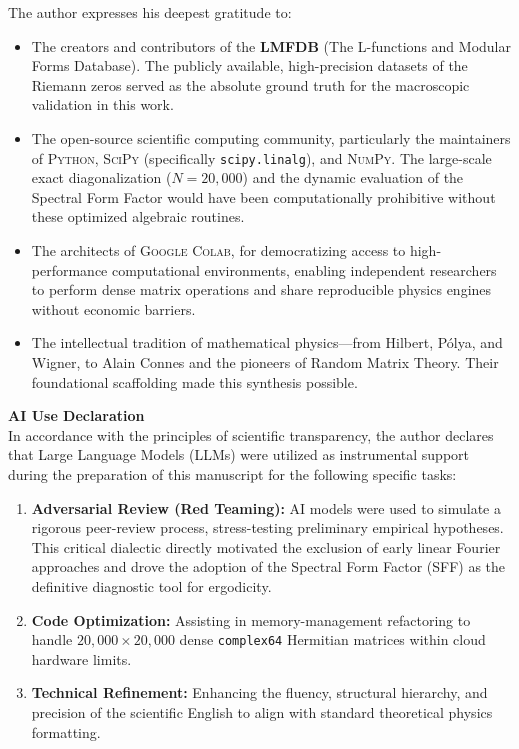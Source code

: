 \documentclass[aps,prl,preprint,superscriptaddress,floatfix]{revtex4-2}
\begin{document}
\begin{acknowledgments}
The author expresses his deepest gratitude to:

\begin{itemize}
    \item The creators and contributors of the \textbf{LMFDB} (The L-functions and Modular Forms Database). The publicly available, high-precision datasets of the Riemann zeros served as the absolute ground truth for the macroscopic validation in this work.
    
    \item The open-source scientific computing community, particularly the maintainers of \textsc{Python}, \textsc{SciPy} (specifically \texttt{scipy.linalg}), and \textsc{NumPy}. The large-scale exact diagonalization ($N=20,000$) and the dynamic evaluation of the Spectral Form Factor would have been computationally prohibitive without these optimized algebraic routines.
    
    \item The architects of \textsc{Google Colab}, for democratizing access to high-performance computational environments, enabling independent researchers to perform dense matrix operations and share reproducible physics engines without economic barriers.
    
    \item The intellectual tradition of mathematical physics—from Hilbert, Pólya, and Wigner, to Alain Connes and the pioneers of Random Matrix Theory. Their foundational scaffolding made this synthesis possible.
\end{itemize}

\vspace{0.3cm}
\noindent \textbf{AI Use Declaration} \\
In accordance with the principles of scientific transparency, the author declares that Large Language Models (LLMs) were utilized as instrumental support during the preparation of this manuscript for the following specific tasks:

\begin{enumerate}
    \item \textbf{Adversarial Review (Red Teaming):} AI models were used to simulate a rigorous peer-review process, stress-testing preliminary empirical hypotheses. This critical dialectic directly motivated the exclusion of early linear Fourier approaches and drove the adoption of the Spectral Form Factor (SFF) as the definitive diagnostic tool for ergodicity.
    \item \textbf{Code Optimization:} Assisting in memory-management refactoring to handle $20,000 \times 20,000$ dense \texttt{complex64} Hermitian matrices within cloud hardware limits.
    \item \textbf{Technical Refinement:} Enhancing the fluency, structural hierarchy, and precision of the scientific English to align with standard theoretical physics formatting.
\end{enumerate}


\end{acknowledgments}
\end{document}
